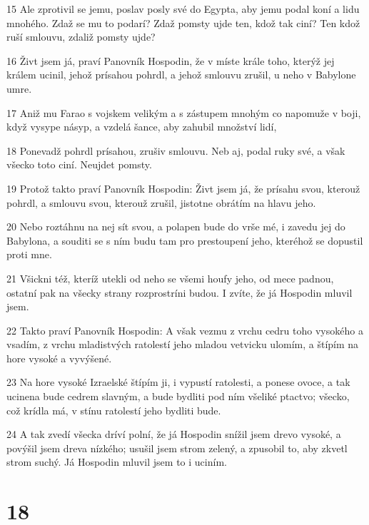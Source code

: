 \par 15 Ale zprotivil se jemu, poslav posly své do Egypta, aby jemu podal koní a lidu mnohého. Zdaž se mu to podarí? Zdaž pomsty ujde ten, kdož tak ciní? Ten kdož ruší smlouvu, zdaliž pomsty ujde?
\par 16 Živt jsem já, praví Panovník Hospodin, že v míste krále toho, kterýž jej králem ucinil, jehož prísahou pohrdl, a jehož smlouvu zrušil, u neho v Babylone umre.
\par 17 Aniž mu Farao s vojskem velikým a s zástupem mnohým co napomuže v boji, když vysype násyp, a vzdelá šance, aby zahubil množství lidí,
\par 18 Ponevadž pohrdl prísahou, zrušiv smlouvu. Neb aj, podal ruky své, a však všecko toto ciní. Neujdet pomsty.
\par 19 Protož takto praví Panovník Hospodin: Živt jsem já, že prísahu svou, kterouž pohrdl, a smlouvu svou, kterouž zrušil, jistotne obrátím na hlavu jeho.
\par 20 Nebo roztáhnu na nej sít svou, a polapen bude do vrše mé, i zavedu jej do Babylona, a souditi se s ním budu tam pro prestoupení jeho, kteréhož se dopustil proti mne.
\par 21 Všickni též, kteríž utekli od neho se všemi houfy jeho, od mece padnou, ostatní pak na všecky strany rozprostríni budou. I zvíte, že já Hospodin mluvil jsem.
\par 22 Takto praví Panovník Hospodin: A však vezmu z vrchu cedru toho vysokého a vsadím, z vrchu mladistvých ratolestí jeho mladou vetvicku ulomím, a štípím na hore vysoké a vyvýšené.
\par 23 Na hore vysoké Izraelské štípím ji, i vypustí ratolesti, a ponese ovoce, a tak ucinena bude cedrem slavným, a bude bydliti pod ním všeliké ptactvo; všecko, což krídla má, v stínu ratolestí jeho bydliti bude.
\par 24 A tak zvedí všecka dríví polní, že já Hospodin snížil jsem drevo vysoké, a povýšil jsem dreva nízkého; usušil jsem strom zelený, a zpusobil to, aby zkvetl strom suchý. Já Hospodin mluvil jsem to i uciním.

\chapter{18}

